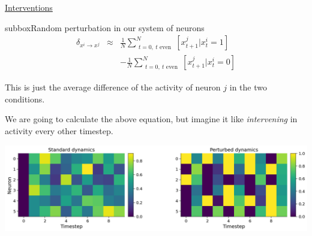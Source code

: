 \begin{textbox}{\href{https://compneuro.neuromatch.io/tutorials/W3D5_NetworkCausality/student/W3D5_Tutorial1.html}{Interventions }   }
\begin{subbox}{subbox}{Random perturbation in our system of neurons}
\begin{eqnarray*}
\delta_{x^i\to x^j} &\approx& \frac1N \sum_{\substack{t=0, \ t \text{ even}}}^N[x_{t+1}^j | x^i_t=1] \\ & & - \frac1N \sum_{\substack{t=0, \ t \text{ even}}}^N[x_{t+1}^j | x^i_t=0]
\end{eqnarray*}

This is just the average difference of the activity of neuron $j$ in the two conditions.

We are going to calculate the above equation, but imagine it like \textit{intervening} in activity every other timestep.

\begin{center}
    
\includegraphics[scale=0.2]{Figures/NC/NC_Figure3.png}
\end{center}
\end{subbox}
\end{textbox}
